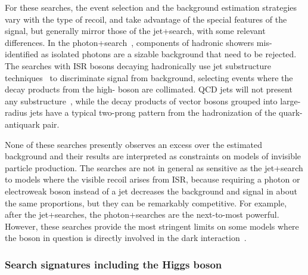 For these searches, the event selection and the background estimation strategies vary with the type of recoil, and take advantage of the special features of the signal, but generally mirror those of the jet+\MET search, with some relevant differences. 
In the photon+\MET search~\cite{Aaboud:2017dor,CMS-PAS-EXO-16-014}, components of hadronic showers mis-identified as isolated photons are a sizable background that need to be rejected. The searches with ISR bosons decaying hadronically use jet substructure techniques~\cite{Sirunyan:2017jix,Aaboud:2016qgg} to discriminate signal from background, selecting events where the decay products from the high-\pt{} boson are collimated. QCD jets will not present any substructure~\cite{Larkoski:2017jix}, while the decay products of vector bosons grouped into large-radius jets have a typical two-prong pattern from the hadronization of the quark-antiquark pair.

None of these searches presently observes an excess over the estimated background and their results are interpreted as constraints on models of invisible particle production. The searches are not in general as sensitive as the jet+\MET search to models where the visible recoil arises from ISR, because requiring a photon or electroweak boson instead of a jet decreases the background and signal in about the same proportions, but they can be remarkably competitive. For example, after the jet+\MET searches, the photon+\MET searches are the next-to-most powerful.
However, these searches provide the most stringent limits on some models where the boson in question is directly involved in the dark interaction~\cite{Petrov:2013nia,Berlin:2014cfa}.%

\subsubsection{Search signatures including the Higgs boson}

